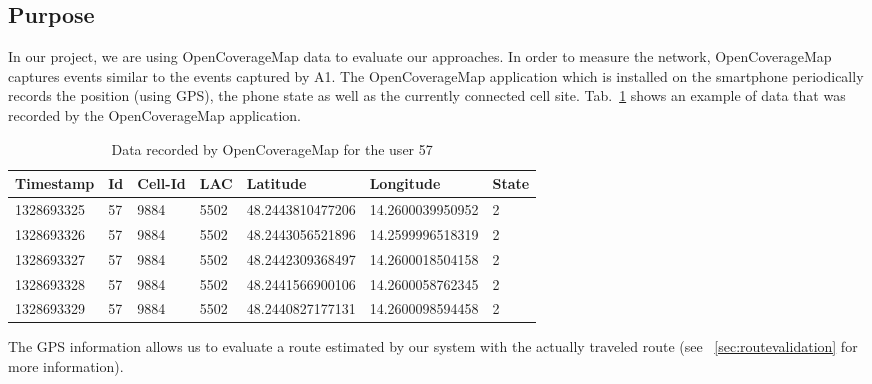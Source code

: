 \documentclass[master,english]{hgbthesis}
\begin{document}
\subsection{Purpose}
In our project, we are using OpenCoverageMap data to evaluate our approaches. In order to measure the network, OpenCoverageMap captures events similar to the events captured by A1.
The OpenCoverageMap application which is installed on the smartphone periodically records the position (using GPS), the phone state as well as the currently connected cell site. Tab.\ \ref{tab:ocmrecord} shows an example of data that was recorded by the OpenCoverageMap application.
\begin{table}[ht]
	\begin{tabular}{|l|l|l|l|l|l|l|}  \hline
		\textbf{Timestamp} & \textbf{Id} & \textbf{Cell-Id} & \textbf{LAC} & \textbf{Latitude} & \textbf{Longitude} & \textbf{State} \\    \hline 1328693325 & 57         & 9884   & 5502 & 48.2443810477206 & 14.2600039950952 & 2 \\  \hline
		1328693326 & 57         & 9884   & 5502 & 48.2443056521896 & 14.2599996518319 & 2\\  \hline
		1328693327 & 57         & 9884   & 5502 & 48.2442309368497 & 14.2600018504158 & 2\\  \hline
		1328693328 & 57         & 9884   & 5502 & 48.2441566900106 & 14.2600058762345 & 2\\  \hline
		1328693329 & 57         & 9884   & 5502 & 48.2440827177131 & 14.2600098594458 & 2\\  \hline
	\end{tabular}
	\caption{Data recorded by OpenCoverageMap for the user 57}
	\label{tab:ocmrecord}
\end{table}
The GPS information allows us to evaluate a route estimated by our system with the actually traveled route (see ~\ref{sec:routevalidation} for more information).
\end{document}
